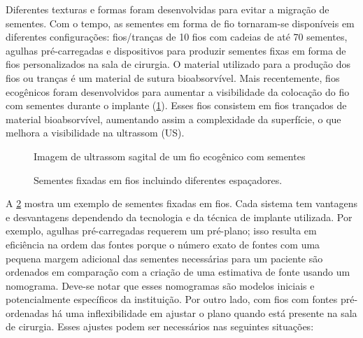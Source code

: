 \documentclass[11pt,a4paper]{article}
\newcounter{exemplo}
\begin{document}
	Diferentes texturas e formas foram desenvolvidas para evitar a migração de sementes. Com o tempo, as sementes em forma de fio tornaram-se disponíveis em diferentes configurações: fios/tranças de 10 fios com cadeias de até 70 sementes, agulhas pré-carregadas e dispositivos para produzir sementes fixas em forma de fios personalizados na sala de cirurgia. O material utilizado para a produção dos fios ou tranças é um material de sutura bioabsorvível. Mais recentemente, fios ecogênicos foram desenvolvidos para aumentar a visibilidade da colocação do fio com sementes durante o implante (\ref{fig:ultrassonSagitalProstataImplante}). Esses fios consistem em fios trançados de material bioabsorvível, aumentando assim a complexidade da superfície, o que melhora a visibilidade na ultrassom (US).

	\begin{figure}[h]
		\centering
		\caption{Imagem de ultrassom sagital de um fio ecogênico com sementes}
		\label{fig:ultrassonSagitalProstataImplante}
	\end{figure}


	\begin{figure}
		\centering
		\caption{Sementes fixadas em fios incluindo diferentes espaçadores.}
		\label{fig:sementesAfixadas}
	\end{figure}

	A \ref{fig:sementesAfixadas} mostra um exemplo de sementes fixadas em fios. Cada sistema tem vantagens e desvantagens dependendo da tecnologia e da técnica de implante utilizada. Por exemplo, agulhas pré-carregadas requerem um pré-plano; isso resulta em eficiência na ordem das fontes porque o número exato de fontes com uma pequena margem adicional das sementes necessárias para um paciente são ordenados em comparação com a criação de uma estimativa de fonte usando um nomograma. Deve-se notar que esses nomogramas são modelos iniciais e potencialmente específicos da instituição. Por outro lado, com fios com fontes pré-ordenadas há uma inflexibilidade em ajustar o plano quando está presente na sala de cirurgia. Esses ajustes podem ser necessários nas seguintes situações:
\end{document}
